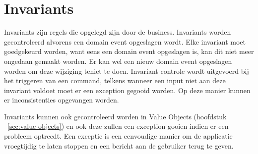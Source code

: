 
\section{Invariants}
\label{sec:invariants}

Invariants zijn regels die opgelegd zijn door de business. Invariants worden gecontroleerd alvorens een domain event opgeslagen wordt. Elke invariant moet goedgekeurd worden, want eens een domain event opgeslagen is, kan dit niet meer ongedaan gemaakt worden. Er kan wel een nieuw domain event opgeslagen worden om deze wijziging teniet te doen. Invariant controle wordt uitgevoerd bij het triggeren van een command, telkens wanneer een input niet aan deze invariant voldoet moet er een exception gegooid worden. Op deze manier kunnen er inconsistenties opgevangen worden.

Invariants kunnen ook gecontroleerd worden in Value Objects (hoofdstuk ~\ref{sec:value-objects}) en ook deze zullen een exception gooien indien er een probleem optreedt.
Een exceptie is een eenvoudige manier om de applicatie vroegtijdig te laten stoppen en een bericht aan de gebruiker terug te geven.
